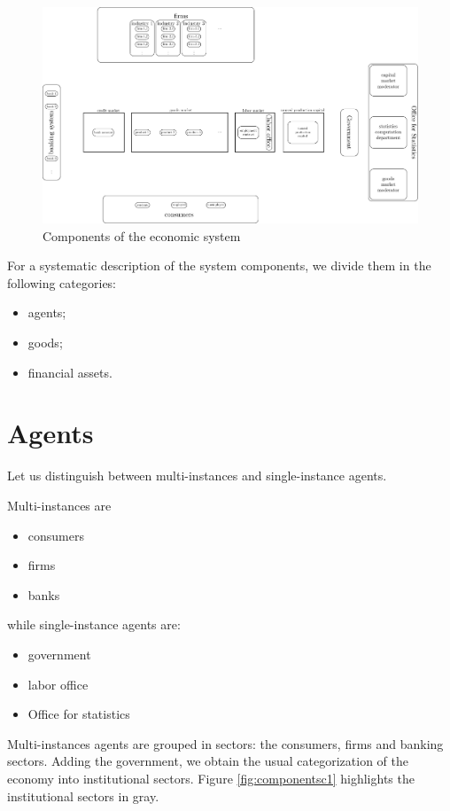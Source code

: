 \documentclass{book}
\begin{document}
\begin{figure}[htp]
\hskip-1cm\includegraphics[scale=0.5]{agents_and_interactions_figure1-0.pdf}
	\caption{Components of the economic system}
	\label{fig:components}
\end{figure}
For a systematic description of the system components, we divide them in the following categories:
\begin{itemize}
	\item agents;
	\item goods;
	\item financial assets.
\end{itemize}
\section{Agents}

Let us distinguish between multi-instances and single-instance agents.  

Multi-instances are
\begin{itemize}
	\item consumers
	\item firms
	\item banks
\end{itemize}

while single-instance agents are:
\begin{itemize}
	\item government
	\item labor office
	\item Office for statistics
\end{itemize}

Multi-instances agents are grouped in sectors: the consumers, firms and banking sectors. Adding the government, we obtain the usual categorization of the economy into institutional sectors. Figure \ref{fig:componentsc1} highlights the institutional sectors in gray.
\end{document}
